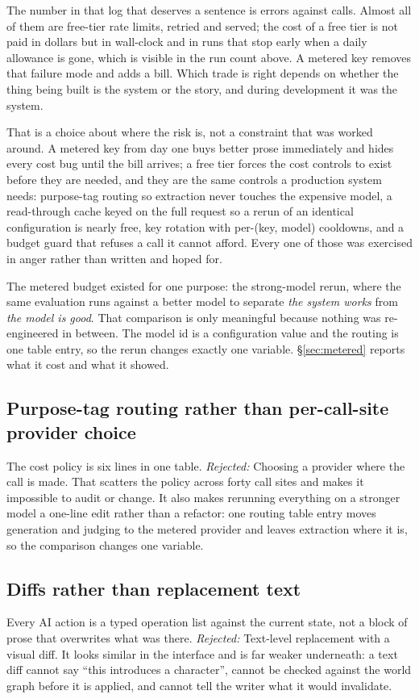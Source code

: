\documentclass{article}
\newcommand{\decision}[1]{\subsection{#1}}
\newcommand{\rejected}[1]{\textit{Rejected:} #1}
\begin{document}
The number in that log that deserves a sentence is \rProviderErrors{} errors against
\rProviderCalls{} calls. Almost all of them are free-tier rate limits, retried and served;
the cost of a free tier is not paid in dollars but in wall-clock and in runs that stop early
when a daily allowance is gone, which is visible in the run count above. A metered key
removes that failure mode and adds a bill. Which trade is right depends on whether the
thing being built is the system or the story, and during development it was the system.

That is a choice about where the risk is, not a constraint that was worked around. A
metered key from day one buys better prose immediately and hides every cost bug until the
bill arrives; a free tier forces the cost controls to exist before they are needed, and
they are the same controls a production system needs: purpose-tag routing so extraction
never touches the expensive model, a read-through cache keyed on the full request so a
rerun of an identical configuration is nearly free, key rotation with per-(key, model)
cooldowns, and a budget guard that refuses a call it cannot afford. Every one of those was
exercised in anger rather than written and hoped for.

The metered budget existed for one purpose: the strong-model rerun, where the same
evaluation runs against a better model to separate \emph{the system works} from \emph{the
model is good}. That comparison is only meaningful because nothing was re-engineered in
between. The model id is a configuration value and the routing is one table entry, so the
rerun changes exactly one variable. \S\ref{sec:metered} reports what it cost and what it
showed.

\decision{Purpose-tag routing rather than per-call-site provider choice}
The cost policy is six lines in one table. \rejected{Choosing a provider where the call is
made.} That scatters the policy across forty call sites and makes it impossible to audit
or change. It also makes rerunning everything on a stronger model a one-line edit rather than a
refactor: one routing table entry moves generation and judging to the metered provider and
leaves extraction where it is, so the comparison changes one variable.

\decision{Diffs rather than replacement text}
Every AI action is a typed operation list against the current state, not a block of prose
that overwrites what was there. \rejected{Text-level replacement with a visual diff.} It
looks similar in the interface and is far weaker underneath: a text diff cannot say
``this introduces a character'', cannot be checked against the world graph before it is
applied, and cannot tell the writer what it would invalidate.
\end{document}
